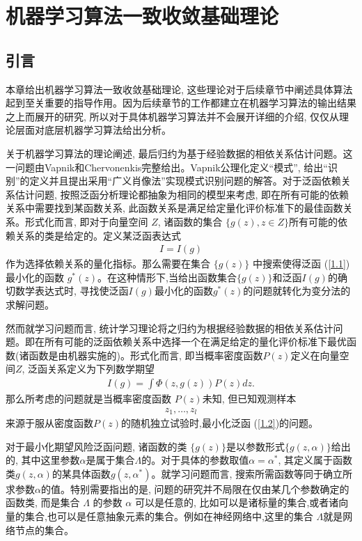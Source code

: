 \chapter{机器学习算法一致收敛基础理论}
\label{chap:edbed}
\section{引言}
本章给出机器学习算法一致收敛基础理论, 这些理论对于后续章节中阐述具体算法起到至关重要的指导作用。因为后续章节的工作都建立在机器学习算法的输出结果之上而展开的研究, 所以对于具体机器学习算法并不会展开详细的介绍, 仅仅从理论层面对底层机器学习算法给出分析。

关于机器学习算法的理论阐述, 最后归约为基于经验数据的相依关系估计问题\citep{vapnik1982}。这一问题由Vapnik和Chervonenkis完整给出\citep{vapnik1974,vapnik1979,Vapnik2006,Chervonenkis2013}。Vapnik公理化定义“模式”, 给出“识别”的定义并且提出采用“广义肖像法”实现模式识别问题的解答\citep{vapnik1962,vapnik1963,vapnik1964On,vapnik1964}。对于泛函依赖关系估计问题, 按照泛函分析理论都抽象为相同的模型来考虑, 即在所有可能的依赖关系中需要找到某函数关系, 此函数关系是满足给定量化评价标准下的最佳函数关系。形式化而言, 即对于向量空间 $Z$, 诸函数的集合 $\{g(z), z \in Z\}$所有可能的依赖关系的类是给定的。定义某泛函表达式
\begin{align}\label{1.1}
I = I(g)
\end{align}
作为选择依赖关系的量化指标。那么需要在集合 $\{g(z)\}$ 中搜索使得泛函 (\ref{1.1}) 最小化的函数 $g^{*}(z)$。在这种情形下,当给出函数集合$\{g(z)\}$和泛函$I(g)$的确切数学表达式时, 寻找使泛函$I(g)$最小化的函数$g^{*}(z)$的问题就转化为变分法的求解问题\citep{Hilbert1950,mmp-1953,mmp-1962,Marx1881}。

然而就学习问题而言, 统计学习理论将之归约为根据经验数据的相依关系估计问题\citep{vapnik1974,Faffelberger1980}。即在所有可能的泛函依赖关系中选择一个在满足给定的量化评价标准下最优函数(诸函数是由机器实施的)。形式化而言, 即当概率密度函数$P(z)$定义在向量空间$Z$, 泛函关系定义为下列数学期望
\begin{align}\label{1.2}
I(g) = \int \Phi(z,g(z))P(z)dz.
\end{align}
那么所考虑的问题就是当概率密度函数 $P(z)$未知, 但已知观测样本
\begin{align}\label{1.3}
z_1,\ldots,z_l
\end{align}
来源于服从密度函数$P(z)$的随机独立试验时,最小化泛函 (\ref{1.2})的问题。

对于最小化期望风险泛函问题, 诸函数的类 $\{g(z)\}$是以参数形式$\{g(z,\alpha)\}$给出的, 其中这里参数$\alpha$是属于集合$\Lambda$的。对于具体的参数取值$\alpha = \alpha^{*}$, 其定义属于函数类$g(z,\alpha)$的某具体函数$g(z, \alpha^{*})$。就学习问题而言, 搜索所需函数等同于确立所求参数$\alpha$的值。特别需要指出的是, 问题的研究并不局限在仅由某几个参数确定的函数类, 而是集合 $\Lambda$ 的参数 $\alpha$ 可以是任意的, 比如可以是诸标量的集合,或者诸向量的集合,也可以是任意抽象元素的集合。例如在神经网络中,这里的集合 $\Lambda$就是网络节点的集合。

